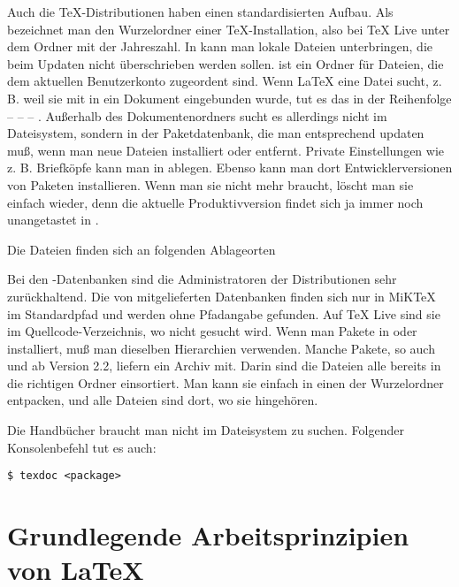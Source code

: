 \documentclass[12pt]{scrreprt}
\begin{document}
Auch die \TeX-Distributionen haben einen standardisierten Aufbau. Als  bezeichnet man den Wurzelordner einer \TeX-Installation, also bei \TeX{} Live unter dem Ordner mit der Jahreszahl. In  kann man lokale Dateien unterbringen, die beim Updaten nicht überschrieben werden sollen.  ist ein Ordner für Dateien, die dem aktuellen Benutzerkonto zugeordent sind. Wenn \LaTeX{} eine Datei sucht, z. B. weil sie mit  in ein Dokument eingebunden wurde, tut es das in der Reihenfolge  –  –  – . Außerhalb des Dokumentenordners sucht es allerdings nicht im Dateisystem, sondern in der Paketdatenbank, die man entsprechend updaten muß, wenn man neue Dateien installiert oder entfernt. Private Einstellungen wie z. B. Briefköpfe kann man in  ablegen. Ebenso kann man dort Entwicklerversionen von Paketen installieren. Wenn man sie nicht mehr braucht, löscht man sie einfach wieder, denn die aktuelle Produktivversion findet sich ja immer noch unangetastet in .

Die Dateien finden sich an folgenden Ablageorten

Bei den \BibTeX-Datenbanken sind die Administratoren der Distributionen sehr zurückhaltend. Die von \archbib mitgelieferten Datenbanken finden sich nur in MiK\TeX{} im Standardpfad und werden ohne Pfadangabe gefunden. Auf \TeX{} Live sind sie im Quellcode-Verzeichnis, wo nicht gesucht wird. Wenn man Pakete in  oder  installiert, muß man dieselben Hierarchien verwenden. Manche Pakete, so auch \blx und \archbib ab Version 2.2, liefern ein Archiv  mit. Darin sind die Dateien alle bereits in die richtigen Ordner einsortiert. Man kann sie einfach in einen der Wurzelordner entpacken, und alle Dateien sind dort, wo sie hingehören.

Die Handbücher braucht man nicht im Dateisystem zu suchen. Folgender Konsolenbefehl tut es auch:
\begin{Verbatim}
$ texdoc <package>
\end{Verbatim}
\chapter{Grundlegende Arbeitsprinzipien von \LaTeX{}}
\end{document}
